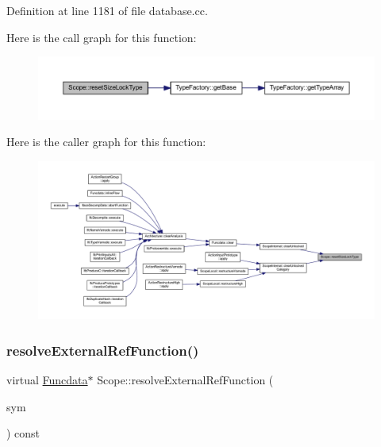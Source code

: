 Definition at line 1181 of file database.\+cc.

Here is the call graph for this function\+:
\nopagebreak
\begin{figure}[H]
\begin{center}
\leavevmode
\includegraphics[width=350pt]{class_scope_a4af52229967e3a507a5367e14a298142_cgraph}
\end{center}
\end{figure}
Here is the caller graph for this function\+:
\nopagebreak
\begin{figure}[H]
\begin{center}
\leavevmode
\includegraphics[width=350pt]{class_scope_a4af52229967e3a507a5367e14a298142_icgraph}
\end{center}
\end{figure}
\mbox{\label{class_scope_af4c45025894f1996ef0f3556752cd997}} 
\subsubsection{\texorpdfstring{resolveExternalRefFunction()}{resolveExternalRefFunction()}}
{\footnotesize\ttfamily virtual \mbox{\hyperlink{class_funcdata}{Funcdata}}$\ast$ Scope\+::resolve\+External\+Ref\+Function (\begin{DoxyParamCaption}\item[{\mbox{\hyperlink{class_extern_ref_symbol}{Extern\+Ref\+Symbol}} $\ast$}]{sym }\end{DoxyParamCaption}) const\hspace{0.3cm}{\ttfamily [pure virtual]}}



